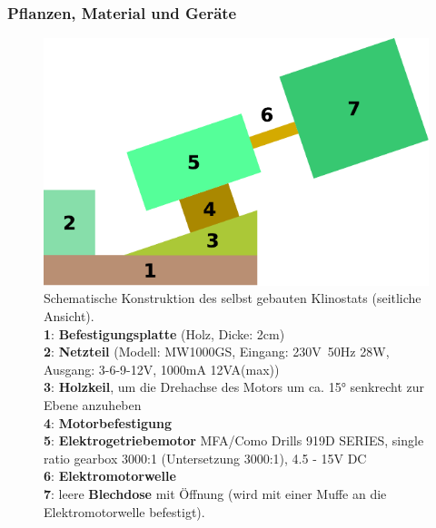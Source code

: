 \documentclass[aspectratio=169
]{beamer}
\begin{document}
\begin{frame}[<+(1)->]
\frametitle{Pflanzen, Material und Geräte}


\begin{figure}
	\begin{minipage}[c]{0.49\textwidth}
		\centering
		\includegraphics[width=\textwidth]{images/drawing-1.pdf}
	\end{minipage}\hfill
	\begin{minipage}[c]{0.49\textwidth}
		\centering
		\caption{Schematische Konstruktion des selbst gebauten Klinostats (seitliche Ansicht). \\\textbf{1}: \textbf{Befestigungsplatte} (Holz, Dicke: 2cm)\\ \textbf{2}: \textbf{Netzteil} (Modell: MW1000GS, Eingang: 230V~50Hz 28W, Ausgang: 3-6-9-12V, 1000mA 12VA(max))\\ \textbf{3}: \textbf{Holzkeil}, um die Drehachse des Motors um ca. \ang{15} senkrecht zur Ebene anzuheben\\ \textbf{4}: \textbf{Motorbefestigung}\\ \textbf{5}: \textbf{Elektrogetriebemotor} MFA/Como Drills 919D SERIES, single ratio gearbox 3000:1 (Untersetzung 3000:1), 4.5 - 15V DC\\ \textbf{6}: \textbf{Elektromotorwelle}\\\textbf{7}: leere \textbf{Blechdose} mit Öffnung (wird mit einer Muffe an die Elektromotorwelle befestigt)\label{Klinstat1}.} 
	\end{minipage}
\end{figure}

\end{frame}
	
\end{document}
